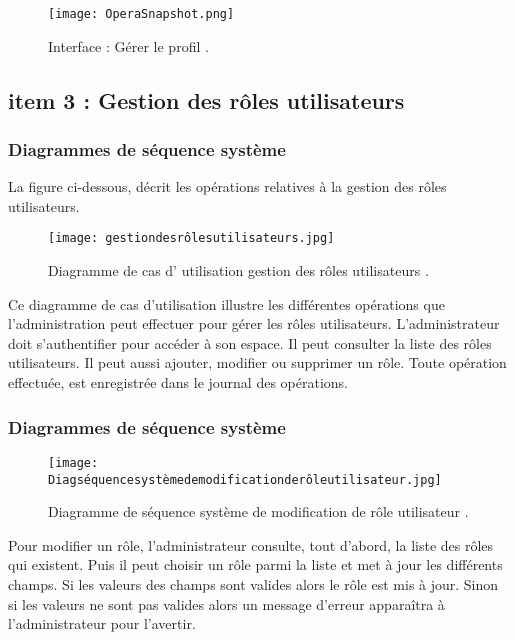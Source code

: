 \begin{figure}[ht]
	\centering
	\texttt{[image: OperaSnapshot.png]}
	\caption{Interface : Gérer le profil .}
	\label{fig:Interface : Gérer le profil }
\end{figure}
\FloatBarrier

\clearpage
\subsection{item 3 : Gestion des rôles utilisateurs}
\subsubsection{Diagrammes de séquence système }

La figure ci-dessous, décrit les opérations relatives à la gestion des rôles utilisateurs.
\begin{figure}[ht]
	\centering
	\texttt{[image: gestiondesrôlesutilisateurs.jpg]}
	\caption{Diagramme de cas d' utilisation gestion des rôles utilisateurs .}
	\label{fig:Diagramme de cas d utilisation gestion des rôles utilisateurs }
\end{figure}
\FloatBarrier
Ce diagramme de cas d’utilisation illustre les différentes opérations que l’administration peut effectuer pour gérer les rôles utilisateurs. L’administrateur doit s’authentifier
pour accéder à son espace. Il peut consulter la liste des rôles utilisateurs. Il peut aussi
ajouter, modifier ou supprimer un rôle. Toute opération effectuée, est enregistrée dans le
journal des opérations.
\clearpage
\subsubsection{Diagrammes de séquence système }


\begin{figure}[ht]
	\centering
	\texttt{[image: Diagséquencesystèmedemodificationderôleutilisateur.jpg]}
	\caption{Diagramme de séquence système de modification de rôle utilisateur .}
	\label{fig:Diagramme de séquence système de modification de rôle utilisateur }
\end{figure}
\FloatBarrier

Pour modifier un rôle, l’administrateur consulte, tout d’abord, la liste des rôles qui
existent. Puis il peut choisir un rôle parmi la liste et met à jour les différents champs. Si
les valeurs des champs sont valides alors le rôle est mis à jour. Sinon si les valeurs ne sont
pas valides alors un message d’erreur apparaîtra à l’administrateur pour l’avertir.
\clearpage
